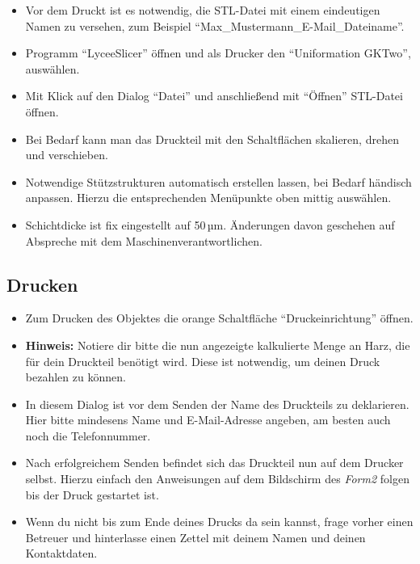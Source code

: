 \documentclass{\basedir/fablab-document}
\begin{document}
\begin{itemize}
    \item Vor dem Druckt ist es notwendig, die STL-Datei mit einem eindeutigen Namen zu versehen, zum Beispiel \enquote{Max\_Mustermann\_E-Mail\_Dateiname}.
    \item Programm \enquote{LyceeSlicer} öffnen und als Drucker den \enquote{Uniformation GKTwo}, auswählen.
    \item Mit Klick auf den Dialog \enquote{Datei} und anschließend mit \enquote{Öffnen} STL-Datei öffnen.
    \item Bei Bedarf kann man das Druckteil mit den Schaltflächen skalieren, drehen und verschieben.
    \item Notwendige Stützstrukturen automatisch erstellen lassen, bei Bedarf händisch anpassen. Hierzu die entsprechenden Menüpunkte oben mittig auswählen.
    \item Schichtdicke ist fix eingestellt auf 50\,µm. Änderungen davon geschehen auf Abspreche mit dem Maschinenverantwortlichen. 
\end{itemize}

\subsection{Drucken}
\begin{itemize}

    \item Zum Drucken des Objektes die orange Schaltfläche \enquote{Druckeinrichtung} öffnen.\\
    \item \textbf{Hinweis:} Notiere dir bitte die nun angezeigte kalkulierte Menge an Harz, die für dein Druckteil benötigt wird. Diese ist notwendig, um deinen Druck bezahlen zu können.
    \item In diesem Dialog ist vor dem Senden der Name des Druckteils zu deklarieren. Hier bitte mindesens Name und E-Mail-Adresse angeben, am besten auch noch die Telefonnummer.\\
    \item Nach erfolgreichem Senden befindet sich das Druckteil nun auf dem Drucker selbst. Hierzu einfach den Anweisungen auf dem Bildschirm des \textit{Form2} folgen bis der Druck gestartet ist.
    \item Wenn du nicht bis zum Ende deines Drucks da sein kannst, frage vorher einen Betreuer und hinterlasse einen Zettel mit deinem Namen und deinen Kontaktdaten.

\end{itemize}
\end{document}
